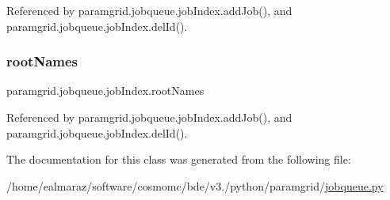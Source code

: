 Referenced by paramgrid.\+jobqueue.\+job\+Index.\+add\+Job(), and paramgrid.\+jobqueue.\+job\+Index.\+del\+Id().

\mbox{\label{classparamgrid_1_1jobqueue_1_1jobIndex_a5529f13349c46f8673d042fa579fcf64}} 
\subsubsection{\texorpdfstring{root\+Names}{rootNames}}
{\footnotesize\ttfamily paramgrid.\+jobqueue.\+job\+Index.\+root\+Names}



Referenced by paramgrid.\+jobqueue.\+job\+Index.\+add\+Job(), and paramgrid.\+jobqueue.\+job\+Index.\+del\+Id().



The documentation for this class was generated from the following file\+:\begin{DoxyCompactItemize}
\item 
/home/ealmaraz/software/cosmomc/bde/v3./python/paramgrid/\mbox{\hyperlink{jobqueue_8py}{jobqueue.\+py}}\end{DoxyCompactItemize}
